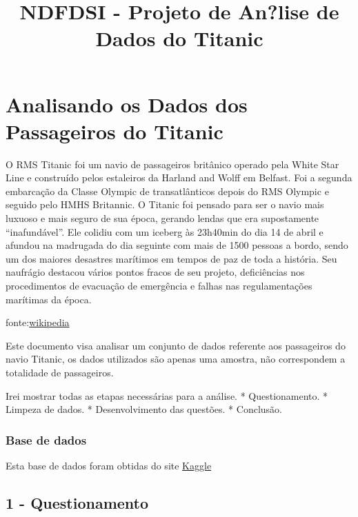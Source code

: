 \documentclass[11pt]{article}
\title{NDFDSI - Projeto de An?lise de Dados do Titanic}
\begin{document}
    
    
    \maketitle
    
    

    
    \hypertarget{analisando-os-dados-dos-passageiros-do-titanic}{%
\section{Analisando os Dados dos Passageiros do
Titanic}\label{analisando-os-dados-dos-passageiros-do-titanic}}

    O RMS Titanic foi um navio de passageiros britânico operado pela White
Star Line e construído pelos estaleiros da Harland and Wolff em Belfast.
Foi a segunda embarcação da Classe Olympic de transatlânticos depois do
RMS Olympic e seguido pelo HMHS Britannic. O Titanic foi pensado para
ser o navio mais luxuoso e mais seguro de sua época, gerando lendas que
era supostamente ``inafundável''. Ele colidiu com um iceberg às 23h40min
do dia 14 de abril e afundou na madrugada do dia seguinte com mais de
1500 pessoas a bordo, sendo um dos maiores desastres marítimos em tempos
de paz de toda a história. Seu naufrágio destacou vários pontos fracos
de seu projeto, deficiências nos procedimentos de evacuação de
emergência e falhas nas regulamentações marítimas da época.

fonte:\href{https://pt.wikipedia.org/wiki/RMS_Titanic}{wikipedia}

Este documento visa analisar um conjunto de dados referente aos
passageiros do navio Titanic, os dados utilizados são apenas uma
amostra, não correspondem a totalidade de passageiros.

Irei mostrar todas as etapas necessárias para a análise. *
Questionamento. * Limpeza de dados. * Desenvolvimento das questões. *
Conclusão.

\hypertarget{base-de-dados}{%
\subsubsection{Base de dados}\label{base-de-dados}}

Esta base de dados foram obtidas do site
\href{https://www.kaggle.com/c/titanic/data}{Kaggle}

    \hypertarget{questionamento}{%
\subsection{1 - Questionamento}\label{questionamento}}
\end{document}
